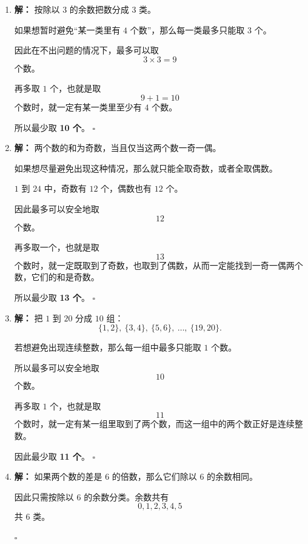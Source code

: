 \documentclass[11pt,a4paper,fontset=fandol]{ctexart}
\theoremstyle{formalexample}
\newenvironment{solution}{\par\noindent\textbf{解：}}{\hfill$\square$\par}
\begin{document}
\begin{enumerate}
\begin{solution}
  所以一定有两个连续整数。
  \end{solution}

  \item \begin{solution}
  按除以 $3$ 的余数把数分成 $3$ 类。

  如果想暂时避免“某一类里有 $4$ 个数”，那么每一类最多只能取 $3$ 个。

  因此在不出问题的情况下，最多可以取
  \[
  3\times 3=9
  \]
  个数。

  再多取 $1$ 个，也就是取
  \[
  9+1=10
  \]
  个数时，就一定有某一类里至少有 $4$ 个数。

  所以最少取 \textbf{10 个}。
  \end{solution}

  \item \begin{solution}
  两个数的和为奇数，当且仅当这两个数一奇一偶。

  如果想尽量避免出现这种情况，那么就只能全取奇数，或者全取偶数。

  $1$ 到 $24$ 中，奇数有 $12$ 个，偶数也有 $12$ 个。

  因此最多可以安全地取
  \[
  12
  \]
  个数。

  再多取一个，也就是取
  \[
  13
  \]
  个数时，就一定既取到了奇数，也取到了偶数，从而一定能找到一奇一偶两个数，它们的和是奇数。

  所以最少取 \textbf{13 个}。
  \end{solution}

  \item \begin{solution}
  把 $1$ 到 $20$ 分成 $10$ 组：
  \[
  \{1,2\},\ \{3,4\},\ \{5,6\},\ \ldots,\ \{19,20\}.
  \]

  若想避免出现连续整数，那么每一组中最多只能取 $1$ 个数。

  所以最多可以安全地取
  \[
  10
  \]
  个数。

  再多取 $1$ 个，也就是取
  \[
  11
  \]
  个数时，就一定有某一组里取到了两个数，而这一组中的两个数正好是连续整数。

  因此最少取 \textbf{11 个}。
  \end{solution}

  \item \begin{solution}
  如果两个数的差是 $6$ 的倍数，那么它们除以 $6$ 的余数相同。

  因此只需按除以 $6$ 的余数分类。余数共有
  \[
  0,1,2,3,4,5
  \]
  共 $6$ 类。


\end{solution}
\end{enumerate}
\end{document}
